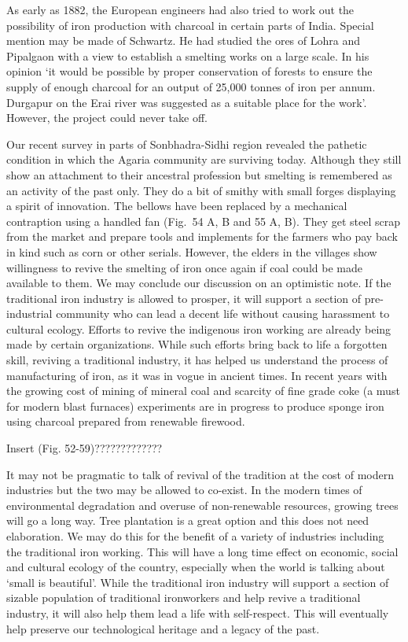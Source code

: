 As early as 1882, the European engineers had also tried to work out the possibility of iron production with charcoal in certain parts of India. Special mention may be made of Schwartz. He had studied the ores of Lohra and Pipalgaon with a view to establish a smelting works on a large scale. In his opinion `it would be possible by proper conservation of forests to ensure the supply of enough charcoal for an output of 25,000 tonnes of iron per annum. Durgapur on the Erai river was suggested as a suitable place for the work'. However, the project could never take off. 

\newpage

Our recent survey in parts of Sonbhadra-Sidhi region revealed the pathetic condition in which the Agaria community are surviving today. Although they still show an attachment to their ancestral profession but smelting is remembered as an activity of the past only. They do a bit of smithy with small forges displaying a spirit of innovation. The bellows have been replaced by a mechanical contraption using a handled fan (Fig.~54 A, B and 55 A, B). They get steel scrap from the market and prepare tools and implements for the farmers who pay back in kind such as corn or other serials. However, the elders in the villages show willingness to revive the smelting of iron once again if coal could be made available to them. We may conclude our discussion on an optimistic note. If the traditional iron industry is allowed to prosper, it will support a section of pre-industrial community who can lead a decent life without causing harassment to cultural ecology. Efforts to revive the indigenous iron working are already being made by certain organizations. While such efforts bring back to life a forgotten skill, reviving a traditional industry, it has helped us understand the process of manufacturing of iron, as it was in vogue in ancient times. In recent years with the growing cost of mining of mineral coal and scarcity of fine grade coke (a must for modern blast furnaces) experiments are in progress to produce sponge iron using charcoal prepared from renewable firewood. 

Insert (Fig. 52-59)?????????????


It may not be pragmatic to talk of revival of the tradition at the cost of modern industries but the two may be allowed to co-exist. In the modern times of environmental degradation and overuse of non-renewable resources, growing trees will go a long way. Tree plantation is a great option and this does not need elaboration. We may do this for the benefit of a variety of industries including the traditional iron working. This will have a long time effect on economic, social and cultural ecology of the country, especially when the world is talking about `small is beautiful'. While the traditional iron industry will support a section of sizable population of traditional ironworkers and help revive a traditional industry, it will also help them lead a life with self-respect. This will eventually help preserve our technological heritage and a legacy of the past.

